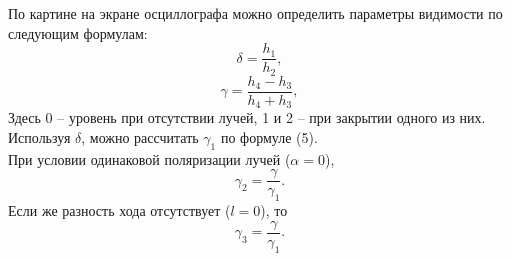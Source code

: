 \documentclass[a4paper,12pt]{article}
\begin{document}
По картине на экране осциллографа можно определить параметры видимости по следующим формулам:
\begin{equation}
\delta = \dfrac{h_1}{h_2},
\end{equation}
\begin{equation}
\gamma = \dfrac{h_4 - h_3}{h_4 + h_3},
\end{equation}
Здесь 0 -- уровень при отсутствии лучей, 1 и 2 -- при закрытии одного из них. Используя $\delta$, можно рассчитать $\gamma_1$ по формуле (5).\\
При условии одинаковой поляризации лучей ($\alpha = 0$),
\begin{equation}
\gamma_2 = \dfrac{\gamma}{\gamma_1}.
\end{equation}
Если же разность хода отсутствует ($l = 0$), то
\begin{equation}
\gamma_3 = \dfrac{\gamma}{\gamma_1}.
\end{equation}
\end{document}
